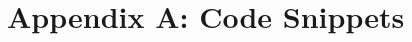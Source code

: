 \documentclass[conference]{IEEEtran}
\begin{document}
{%



%
%


\newpage
\onecolumn
\section{Appendix A: Code Snippets}
}
\end{document}
